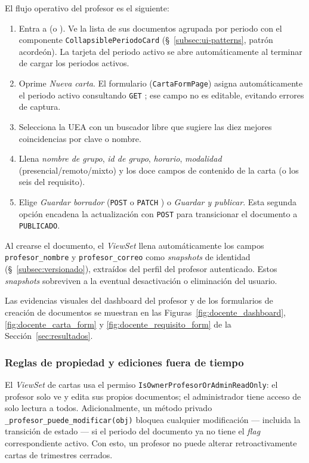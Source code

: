 El flujo operativo del profesor es el siguiente:

\begin{enumerate}
    \item Entra a  (o ). Ve la lista de sus documentos agrupada por periodo con el componente \texttt{CollapsiblePeriodoCard} (\S~\ref{subsec:ui-patterns}, patrón acordeón). La tarjeta del periodo activo se abre automáticamente al terminar de cargar los periodos activos.
    \item Oprime \emph{Nueva carta}. El formulario (\texttt{CartaFormPage}) asigna automáticamente el periodo activo consultando \texttt{GET} ; ese campo no es editable, evitando errores de captura.
    \item Selecciona la UEA con un buscador libre que sugiere las diez mejores coincidencias por clave o nombre.
    \item Llena \emph{nombre de grupo}, \emph{id de grupo}, \emph{horario}, \emph{modalidad} (presencial/remoto/mixto) y los doce campos de contenido de la carta (o los seis del requisito).
    \item Elige \emph{Guardar borrador} (\texttt{POST}  o \texttt{PATCH} ) o \emph{Guardar y publicar}. Esta segunda opción encadena la actualización con \texttt{POST}  para transicionar el documento a \texttt{PUBLICADO}.
\end{enumerate}

Al crearse el documento, el \emph{ViewSet} llena automáticamente los campos \texttt{profesor\_nombre} y \texttt{profesor\_correo} como \emph{snapshots} de identidad (\S~\ref{subsec:versionado}), extraídos del perfil del profesor autenticado. Estos \emph{snapshots} sobreviven a la eventual desactivación o eliminación del usuario.

Las evidencias visuales del dashboard del profesor y de los formularios de creación de documentos se muestran en las Figuras~\ref{fig:docente_dashboard}, \ref{fig:docente_carta_form} y \ref{fig:docente_requisito_form} de la Sección~\ref{sec:resultados}.

\subsubsection{Reglas de propiedad y ediciones fuera de tiempo}

El \emph{ViewSet} de cartas usa el permiso \texttt{IsOwnerProfesorOrAdminReadOnly}: el profesor solo ve y edita sus propios documentos; el administrador tiene acceso de solo lectura a todos. Adicionalmente, un método privado \texttt{\_profesor\_puede\_modificar(obj)} bloquea cualquier modificación --- incluida la transición de estado --- si el periodo del documento ya no tiene el \emph{flag} correspondiente activo. Con esto, un profesor no puede alterar retroactivamente cartas de trimestres cerrados.

